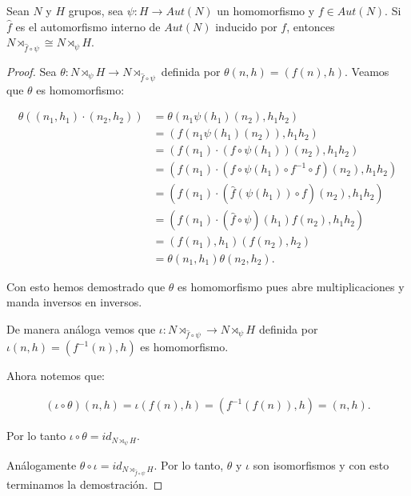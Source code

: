 \begin{lema}
Sean $N$ y $H$ grupos, sea $\psi : H \rightarrow Aut(N)$ un homomorfismo y $f \in Aut(N)$. 
Si $\hat{f}$ es el automorfismo interno de $Aut(N)$ inducido por $f$, entonces
$N \rtimes_{\hat{f} \circ \psi} \cong N \rtimes_\psi H$.\par\null
\end{lema}

\begin{proof}
    Sea $\theta : N \rtimes_\psi H \rightarrow N \rtimes_{\hat{f} \circ \psi}$ definida por
    $\theta(n,h) = (f(n), h)$. Veamos que $\theta$ es homomorfismo:
    
    \begin{align}
        \theta((n_1, h_1)\cdot(n_2, h_2))&= \theta(n_1 \psi(h_1)(n_2), h_1 h_2) \\
                                         &= (f(n_1 \psi(h_1)(n_2)), h_1 h_2)  \\
                                         &= (f(n_1) \cdot (f\circ\psi(h_1))(n_2), h_1 h_2) \\
                                         &= (f(n_1) \cdot (f \circ \psi(h_1) \circ f^{-1} \circ f) (n_2), h_1 h_2) \\
                                         &= (f(n_1) \cdot (\hat{f}(\psi(h_1)) \circ f) (n_2), h_1 h_2) \\
                                         &= (f(n_1) \cdot (\hat{f} \circ \psi)(h_1) f(n_2), h_1 h_2) \\
                                         &= (f(n_1), h_1) (f(n_2), h_2)\\
                                         &= \theta(n_1, h_1) \theta(n_2, h_2).
    \end{align}
    
    Con esto hemos demostrado que $\theta$ es homomorfismo pues abre multiplicaciones y manda inversos en 				
    inversos.\par\null
    
    De manera análoga vemos que $\iota : N \rtimes_{\hat{f} \circ \psi} \rightarrow N \rtimes_\psi H $ 
    definida por $\iota(n,h) = (f^{-1}(n), h)$ es homomorfismo.\par\null
    
    Ahora notemos que:
    
    \begin{align}
        (\iota \circ \theta) (n, h) = \iota(f(n), h) = (f^{-1}(f(n)), h) = (n,h).
    \end{align}		
    
    Por lo tanto $\iota \circ \theta = id_{N \rtimes_\psi H}$.\par\null
    
    An\'alogamente $\theta \circ \iota = id_{N \rtimes_{\hat{f} \circ \psi} H}$. Por lo tanto, $\theta$ y 
    $\iota$ son isomorfismos y con esto terminamos la demostración.
\end{proof}